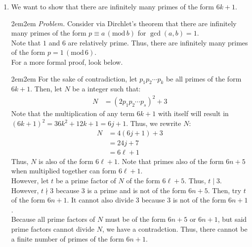 \documentclass[10pt,oneside]{book}
\newcommand{\gspc}{\vspace{0.13cm}} %
\newcommand{\gline}{\gspc\\} %
\newcommand{\gmod}[1]{\,(\text{mod}\,#1)}
\let\endoldproof\endproof
\renewenvironment{proof}[1][\proofname]
  {\vspace{0.2cm}\begin{adjustwidth}{2em}{2em}
   \oldproof[#1]}
  {\endoldproof
\end{adjustwidth}}
\newenvironment{problem}[1]
  {\vspace{-0.1cm}\begin{coloredadjust}\begin{adjustwidth}{2em}{2em}
   \textit{Problem. }#1}
  {\endoldproof
\end{adjustwidth}\end{coloredadjust}\gspc}
\begin{document}
\begin{enumerate}
\begin{enumerate}
\begin{problem}
\begin{align*}
        &=-1\cdot(-1)^{p-1}\\
        &=-1, \;(\text{because }p\text{ is an odd prime}).
      \end{align*}
      Thus, we have that if $p>3$ is an odd prime, then:
    \begin{align*}
      (-3/p)=\begin{cases}
        1\text{ if }p\equiv 1\gmod 6\\
        -1 \text{ if }p\equiv 5 \gmod 6
      \end{cases}
    \end{align*}
    \end{problem}
    \item We want to show that there are infinitely many primes of the form $6k+1$. 
    \begin{problem}
      Consider via Dirchlet's theorem that there are infinitely many primes of the form $p\equiv a\gmod b$ for $\gcd(a,b)=1$. \gline
      Note that $1$ and $6$ are relatively prime. Thus, there are infinitely many primes of the form $p = 1\gmod 6$. \gline
      For a more formal proof, look below.
      \begin{proof}
        For the sake of contradiction, let $p_1p_2\cdots p_k$ be all primes of the form $6k+1$. Then, let $N$ be a integer such that:
        \begin{align*}
          N &= (2p_1p_2\cdots p_s)^2 + 3
        \end{align*}
        Note that the multiplication of any term $6k+1$ with itself will result in $(6k+1)^2 = 36k^2 + 12k + 1 = 6j +1$. Thus, we rewrite $N$:
        \begin{align*}
          N &= 4(6j +1) + 3\\
          &= 24j + 7\\
          &= 6\ell +1
        \end{align*}
        Thus, $N$ is also of the form $6\ell +1$. Note that primes also of the form $6n+5$ when multiplied together can form $6\ell +1$. \gline 
        However, let $t$ be a prime factor of $N$ of the form $6\ell +5$. Thus, $t \mid 3$. However, $t\nmid 3$ because 3 is a prime and is not of the form $6n+5$. Then, try $t$ of the form $6n+1$. It cannot also divide 3 because 3 is not of the form $6n+1$. \gline
        Because all prime factors of $N$ must be of the form $6n+5$ or $6n+1$, but said prime factors cannot divide $N$, we have a contradction. Thus, there cannot be a finite number of primes of the form $6n +1$. 
      \end{proof}

\end{problem}
\end{enumerate}
\end{enumerate}
\end{document}
